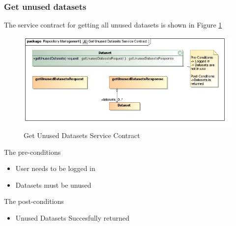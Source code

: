\subsubsection {Get unused datasets}
The service contract for getting all unused datasets is shown in Figure \ref{fig:getUnusedDatasetsService}
\begin{figure}[H]
  \begin{center}
  \includegraphics[scale=0.6]{../Diagrams and Charts/Test Data/Get Unused Datasets Service Contract.jpg}
  \caption{Get Unused Datasets Service Contract}
  \label{fig:getUnusedDatasetsService}
  \end{center}
  
\end{figure}

The pre-conditions
\begin{itemize}
  \item User needs to be logged in
  \item Datasets must be unused
\end{itemize}

The post-conditions
\begin{itemize}
  \item Unused Datasets Succesfully returned
\end{itemize}

